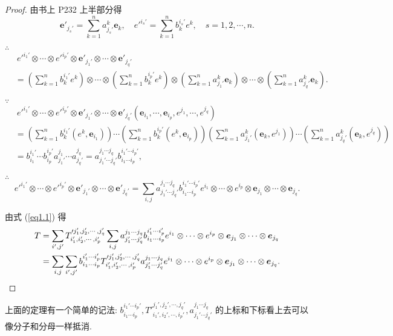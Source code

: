 \documentclass{ctexart}
\begin{document}
\begin{proof}
    由书上 P232 上半部分得
    \[\boldsymbol{e}'_{j_s'}=\sum\limits_{k=1}^na_{j_s'}^k\boldsymbol{e}_k,\quad e'^{i_s'}=\sum\limits_{k=1}^nb_k^{i_s'}e^k,\quad s=1,2,\cdots,n.\]

    $\therefore$
    \begin{align*}
        & \ e'^{i_1'}\otimes\cdots\otimes e'^{i_p'}\otimes\boldsymbol{e}'_{j_1'}\otimes\cdots\otimes\boldsymbol{e}'_{j_q'} \\
        & =\left(\sum\limits_{k=1}^nb_k^{i_1'}e^k\right)\otimes\cdots\otimes\left(\sum\limits_{k=1}^nb_k^{i_p'}e^k\right)\otimes\left(\sum\limits_{k=1}^na_{j_1'}^k\boldsymbol{e}_k\right)\otimes\cdots\otimes\left(\sum\limits_{k=1}^na_{j_q'}^k\boldsymbol{e}_k\right).
    \end{align*}

    $\because$
    \begin{align*}
        & \ e'^{i_1'}\otimes\cdots\otimes e'^{i_p'}\otimes\boldsymbol{e}'_{j_1'}\otimes\cdots\otimes\boldsymbol{e}'_{j_q'}(\boldsymbol{e}_{i_1},\cdots,\boldsymbol{e}_{i_p},e^{j_1},\cdots,e^{j_q}) \\
        & =\left(\sum\limits_{k=1}^nb_k^{i_1'}(e^k,\boldsymbol{e}_{i_1})\right)\cdots\left(\sum\limits_{k=1}^nb_k^{i_p'}(e^k,\boldsymbol{e}_{i_p})\right)\left(\sum\limits_{k=1}^na_{j_1'}^k(\boldsymbol{e}_k,e^{j_1})\right)\cdots\left(\sum\limits_{k=1}^na_{j_q'}^k(\boldsymbol{e}_k,e^{j_q})\right) \\
        & =b^{i_1'}_{i_1}\cdots b^{i_p'}_{i_p}a^{j_1}_{j_1'}\cdots a^{j_q}_{j_q'}=a^{j_1\cdots j_q}_{j_1'\cdots j_q'}b^{i_1'\cdots i_p'}_{i_1\cdots i_p},
    \end{align*}

    $\therefore$
    \[e'^{i_1'}\otimes\cdots\otimes e'^{i_p'}\otimes\boldsymbol{e}'_{j_1'}\otimes\cdots\otimes\boldsymbol{e}'_{j_q'}=\sum\limits_{i,j}a^{j_1\cdots j_q}_{j_1'\cdots j_q'}b^{i_1'\cdots i_p'}_{i_1\cdots i_p}e^{i_1}\otimes\cdots\otimes e^{i_p}\otimes\boldsymbol{e}_{j_1}\otimes\cdots\otimes\boldsymbol{e}_{j_q}.\]

    由式 (\ref{eq1.1}) 得
    \begin{align*}
        T & =\sum\limits_{i',j'}T'^{j_1',j_2',\cdots,j_q'}_{i_1',i_2',\cdots,i_p'}\sum\limits_{i,j}a^{j_1\cdots j_q}_{j_1'\cdots j_q'}b^{i_1'\cdots i_p'}_{i_1\cdots i_p}e^{i_1}\otimes\cdots\otimes e^{i_p}\otimes\boldsymbol{e}_{j_1}\otimes\cdots\otimes\boldsymbol{e}_{j_q} \\
        & =\sum\limits_{i,j}\sum\limits_{i',j'}b^{i_1'\cdots i_p'}_{i_1\cdots i_p}T'^{j_1',j_2',\cdots,j_q'}_{i_1',i_2',\cdots,i_p'}a^{j_1\cdots j_q}_{j_1'\cdots j_q'}e^{i_1}\otimes\cdots\otimes e^{i_p}\otimes\boldsymbol{e}_{j_1}\otimes\cdots\otimes\boldsymbol{e}_{j_q}.\qedhere
    \end{align*}
\end{proof}
上面的定理有一个简单的记法: $b^{i_1'\cdots i_p'}_{i_1\cdots i_p},T'^{j_1',j_2',\cdots,j_q'}_{i_1',i_2',\cdots,i_p'},a^{j_1\cdots j_q}_{j_1'\cdots j_q'}$ 的上标和下标看上去可以像分子和分母一样抵消.
\end{document}
